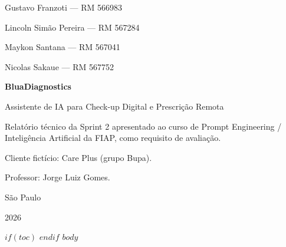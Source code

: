 \documentclass[12pt,a4paper]{article}
\begin{document}
\begin{titlepage}
\begin{center}

{\large Gustavo Franzoti --- RM 566983\par}
{\large Lincoln Simão Pereira --- RM 567284\par}
{\large Maykon Santana --- RM 567041\par}
{\large Nicolas Sakaue --- RM 567752\par}

\vspace{3cm}

{\LARGE\bfseries BluaDiagnostics\par}
\vspace{0.4cm}
{\large Assistente de IA para Check-up Digital e Prescrição Remota\par}

\end{center}

\vspace{2cm}

\hspace{6cm}\begin{minipage}{7cm}
\small
Relatório técnico da Sprint 2 apresentado ao curso de Prompt Engineering / Inteligência Artificial da FIAP, como requisito de avaliação.

\vspace{0.5cm}
Cliente fictício: Care Plus (grupo Bupa).

\vspace{0.5cm}
Professor: Jorge Luiz Gomes.
\end{minipage}

\vfill

\begin{center}
{\large São Paulo\par}
{\large 2026\par}
\end{center}

\end{titlepage}

$if(toc)$
{\hypersetup{linkcolor=black}
\setcounter{tocdepth}{$toc-depth$}
\tableofcontents
\newpage
}
$endif$
$body$
\end{document}

